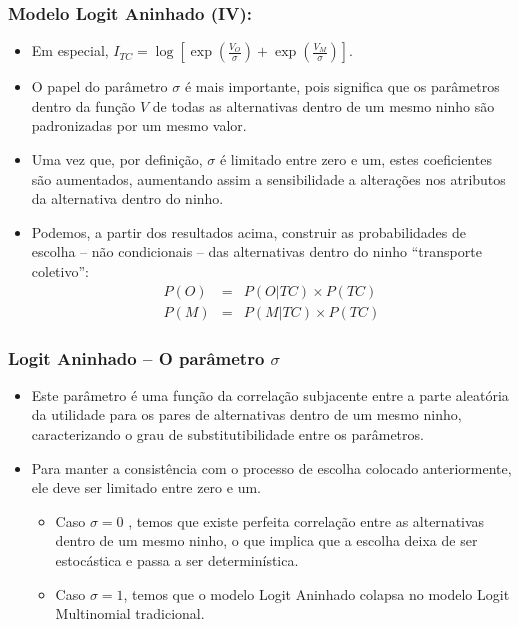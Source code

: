 \documentclass{beamer}
\begin{document}
\begin{frame}\frametitle{Modelo Logit Aninhado (IV):}

\begin{itemize}
\item Em especial, $I_{TC}=\log[\exp\left(\frac{V_{O}}{\sigma}\right)+\exp\left(\frac{V_{M}}{\sigma}\right)]$. 
\item O papel do parâmetro $\sigma$ é mais importante, pois significa que
os parâmetros dentro da função $V$ de todas as alternativas dentro
de um mesmo ninho são padronizadas por um mesmo valor. 
\item Uma vez que, por definição, $\sigma$ é limitado entre zero e um,
estes coeficientes são aumentados, aumentando assim a sensibilidade
a alterações nos atributos da alternativa dentro do ninho. 
\item Podemos, a partir dos resultados acima, construir as probabilidades
de escolha -- não condicionais -- das alternativas
dentro do ninho ``transporte coletivo'':
\begin{eqnarray*}
P(O) & = & P(O|TC)\times P(TC)\\
P(M) & = & P(M|TC)\times P(TC)
\end{eqnarray*}
\end{itemize}
\end{frame}

\begin{frame}\frametitle{Logit Aninhado -- O parâmetro $\sigma$}
\small
\begin{itemize}
\item Este parâmetro é uma função da correlação subjacente entre a parte
aleatória da utilidade para os pares de alternativas dentro de um
mesmo ninho, caracterizando o grau de substitutibilidade entre os
parâmetros. 
\item Para manter a consistência com o processo de escolha colocado anteriormente,
ele deve ser limitado entre zero e um. 

\begin{itemize}
\item Caso $\sigma=0$ , temos que existe perfeita correlação entre as alternativas
dentro de um mesmo ninho, o que implica que a escolha deixa de ser
estocástica e passa a ser determinística. 
\item Caso $\sigma=1$, temos que o modelo Logit Aninhado colapsa no modelo
Logit Multinomial tradicional.
\end{itemize}
\end{itemize}
\end{frame}
\end{document}
